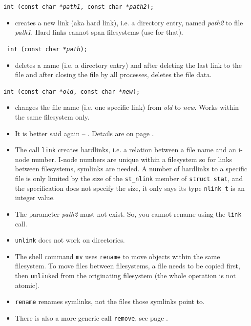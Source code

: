\begin{slide}
\texttt{int (const char *\emph{path1}, const char *\emph{path2});}
\begin{itemize}
\item creates a new link (aka hard link), i.e. a directory entry, named
\emph{path2} to file \emph{path1}.  Hard links cannot span filesystems (use
 for that).
\end{itemize}
\texttt{ int (const char *\emph{path});}
\begin{itemize}
\item deletes a name (i.e. a directory entry) and after deleting the last link to
the file and after closing the file by all processes, deletes the file data.
\end{itemize}
\texttt{int (const char *\emph{old}, const char *\emph{new});}
\begin{itemize}
\item changes the file name (i.e. one specific link) from \emph{old} to
\emph{new}.  Works within the same filesystem only.
\end{itemize}
\end{slide}

\begin{itemize}
\item It is better said again -- .  Details are on page \pageref{FILEDELETE}.
\item The call \texttt{link} creates hardlinks, i.e. a relation between a file
name and an i-node number.  I-node numbers are unique within a filesystem so for
links between filesystems, symlinks are needed.  A number of hardlinks to a
specific file is only limited by the size of the \texttt{st\_nlink} member of
\texttt{struct stat}, and the specification does not specify the size, it only
says its type \texttt{nlink\_t} is an integer value.
\item The parameter \emph{path2} must not exist.  So, you cannot rename using
the \texttt{link} call.
\item \texttt{unlink} does not work on directories.
\item The shell command \texttt{mv} uses \texttt{rename} to move objects within
the same filesystem.  To move files between filesystems, a file needs to be
copied first, then \texttt{unlink}ed from the originating filesystem (the whole
operation is not atomic).
\item \texttt{rename} renames symlinks, not the files those symlinks point to.
\item There is also a more generic call \texttt{remove}, see page
\pageref{REMOVE}.
\end{itemize}

